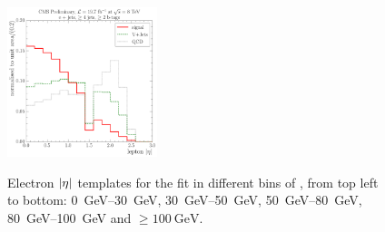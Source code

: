 \begin{figure}[!htbp]
    \hspace*{\fill} \\
    \hspace*{\fill}
    {\includegraphics[width=0.39\textwidth]{measurement/MT/central/fit_templates/electron_templates_bin_100-inf}}
    \hspace*{\fill}
    \caption[Electron $\abs \eta$ templates for the fit in different bins of \MT]{Electron $\abs \eta$ templates for the
    fit in different bins of \MT, from top left to bottom: \SIrange{0}{30}{\GeV}, \SIrange{30}{50}{\GeV},
    \SIrange{50}{80}{\GeV}, \SIrange{80}{100}{\GeV} and $\geq \SI{100}{\GeV}$.}
    \label{fig:fit_tempaltes_MT_electron}
\end{figure}

